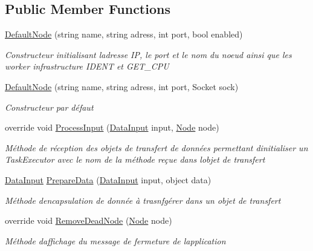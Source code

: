 \subsection*{Public Member Functions}
\begin{DoxyCompactItemize}
\item 
\hyperlink{class_node_net_1_1_network_1_1_nodes_1_1_default_node_af5a2dd57a6c7ebd12cffc4d1ba5f118c}{Default\+Node} (string name, string adress, int port, bool enabled)
\begin{DoxyCompactList}\small\item\em Constructeur initialisant l\textquotesingle{}adresse IP, le port et le nom du noeud ainsi que les worker infrastructure I\+D\+E\+NT et G\+E\+T\+\_\+\+C\+PU \end{DoxyCompactList}\item 
\hyperlink{class_node_net_1_1_network_1_1_nodes_1_1_default_node_a8256e90c7e01f73754a9150f44f95401}{Default\+Node} (string name, string adress, int port, Socket sock)
\begin{DoxyCompactList}\small\item\em Constructeur par défaut \end{DoxyCompactList}\item 
override void \hyperlink{class_node_net_1_1_network_1_1_nodes_1_1_default_node_abfabd743e94b2a4eabd9ccd17562fb57}{Process\+Input} (\hyperlink{class_node_net_1_1_data_1_1_data_input}{Data\+Input} input, \hyperlink{class_node_net_1_1_network_1_1_nodes_1_1_node}{Node} node)
\begin{DoxyCompactList}\small\item\em Méthode de réception des objets de transfert de données permettant d\textquotesingle{}initialiser un Task\+Executor avec le nom de la méthode reçue dans l\textquotesingle{}objet de transfert \end{DoxyCompactList}\item 
\hyperlink{class_node_net_1_1_data_1_1_data_input}{Data\+Input} \hyperlink{class_node_net_1_1_network_1_1_nodes_1_1_default_node_acc8c53ee0bede567eadb444443f62310}{Prepare\+Data} (\hyperlink{class_node_net_1_1_data_1_1_data_input}{Data\+Input} input, object data)
\begin{DoxyCompactList}\small\item\em Méthode d\textquotesingle{}encapsulation de donnée à trasnfgérer dans un objet de transfert \end{DoxyCompactList}\item 
override void \hyperlink{class_node_net_1_1_network_1_1_nodes_1_1_default_node_ab3951a37220f6ca8905727fa45a96fa3}{Remove\+Dead\+Node} (\hyperlink{class_node_net_1_1_network_1_1_nodes_1_1_node}{Node} node)
\begin{DoxyCompactList}\small\item\em Méthode d\textquotesingle{}affichage du message de fermeture de l\textquotesingle{}application \end{DoxyCompactList}\end{DoxyCompactItemize}
